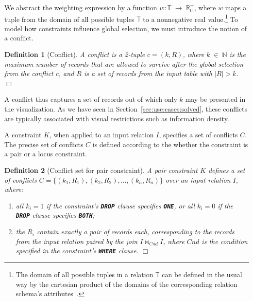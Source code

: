 \documentclass[11pt, oneside]{report}
\newtheorem{definition}{Definition}
\newcommand{\mathendbox}{\hfill$\Box$}
\begin{document}
{We abstract the weighting expression by a function $w: \mathbb{T} \; \rightarrow \; \mathbb{R}_{0}^+$, where $w$ maps a tuple from the domain of all possible tuples $\mathbb{T}$ to a nonnegative real value.\footnote{The domain of all possible tuples in a relation $\mathbb{T}$ can be defined in the usual way by the cartesian product of the domains of the corresponding relation schema's attributes~\cite{RG02:CowBook}.} To model how constraints influence global selection, we must introduce the notion of a conflict. 

\begin{definition}[Conflict]
A conflict is a 2-tuple $c = (k, R)$, where $k \; \in \; \mathbb{N}$ is the maximum number of records that are allowed to survive after the global selection from the conflict $c$, and $R$ is a set of records from the input table with $|R| > k$. \mathendbox
\end{definition}
 
A conflict thus captures a set of records out of which only $k$ may be presented in the visualization. As we have seen in Section~\ref{sec:use:cases:solved}, these conflicts are typically associated with visual restrictions such as information density. 
 
A constraint $K$, when applied to an input relation $I$, specifies a set of conflicts $C$. The precise set of conflicts $C$ is defined according to the whether the constraint is a pair or a locus constraint. 

\begin{definition}[Conflict set for pair constraint]
A pair constraint $K$ defines a set of conflicts $C = \{ (k_1, R_1), (k_2, R_2), \ldots, (k_n, R_n) \}$ over an input relation $I$, where:
\begin{enumerate}[label=(\alph*)]
\item all $k_i = 1$ if the constraint's \textbf{\texttt{DROP}} clause specifies \textbf{\texttt{ONE}}, or all $k_i = 0$ if the \textbf{\texttt{DROP}} clause specifies \textbf{\texttt{BOTH}};
\item the $R_i$ contain exactly a pair of records each, corresponding to the records from the input relation paired by the join $I \bowtie_{Cnd} I$, where $Cnd$ is the condition specified in the constraint's \textbf{\texttt{WHERE}} clause. \mathendbox
\end{enumerate}   
\label{def:conflict:set:pair}
\end{definition} 

}
\end{document}
